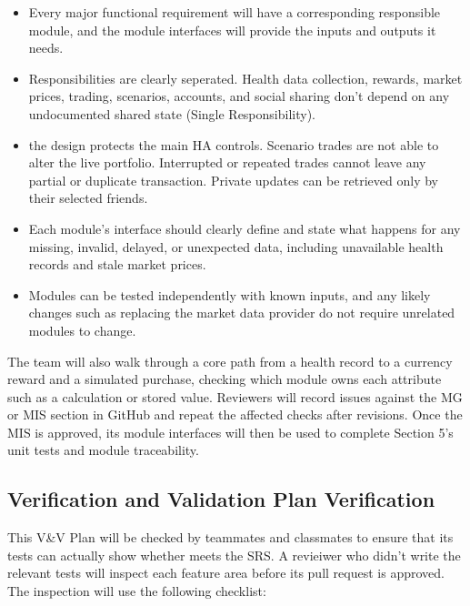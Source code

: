 \documentclass[12pt, titlepage]{article}
\begin{document}
\begin{itemize}

  \item Every major functional requirement will have a corresponding responsible module, and the module interfaces will provide the inputs and outputs it needs.

  \item Responsibilities are clearly seperated. Health data collection, rewards, market prices, trading, scenarios, accounts, and social sharing don't depend on any undocumented shared state (Single Responsibility).

  \item the design protects the main HA controls. Scenario trades are not able to alter the live portfolio. Interrupted or repeated trades cannot leave any partial or duplicate transaction. Private updates can be retrieved only by their selected friends.

  \item Each module's interface should clearly define and state what happens for any missing, invalid, delayed, or unexpected data, including unavailable health records and stale market prices.

  \item Modules can be tested independently with known inputs, and any likely changes such as replacing the market data provider do not require unrelated modules to change.
\end{itemize}
The team will also walk through a core path from a health record to a currency reward and a simulated purchase, checking which module owns each attribute such as a calculation or stored value. Reviewers will record issues against the MG or MIS section in GitHub and repeat the affected checks after revisions. Once the MIS is approved, its module interfaces will then be used to complete Section 5's unit tests and module traceability.
\subsection{Verification and Validation Plan Verification}

This V\&V Plan will be checked by teammates and classmates to ensure that its tests can actually show whether \progname{} meets the SRS. A revieiwer who didn't write the relevant tests will inspect each feature area before its pull request is approved. The inspection will use the following checklist:
\end{document}
